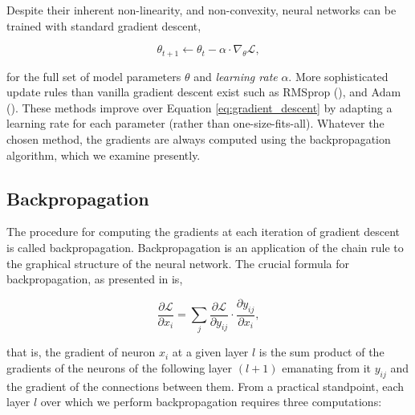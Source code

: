 Despite their inherent non-linearity, and non-convexity, neural networks can be trained with standard gradient descent,

\begin{equation}
\theta_{t+1} \leftarrow \theta_t - \alpha \cdot \nabla_{\theta}\mathcal{L},
\label{eq:gradient_descent}
\end{equation}

for the full set of model parameters $\theta$ and \emph{learning rate} $\alpha$. More sophisticated update rules than vanilla gradient descent exist such as RMSprop (\cite{tieleman2012lecture}), and Adam (\cite{kingma2014adam}). These methods improve over Equation \ref{eq:gradient_descent} by adapting a learning rate for each parameter (rather than one-size-fits-all). Whatever the chosen method, the gradients are always computed using the backpropagation algorithm, which we examine presently.


\subsection{Backpropagation}

The procedure for computing the gradients at each iteration of gradient descent is called backpropagation. Backpropagation is an application of the chain rule to the graphical structure of the neural network. The crucial formula for backpropagation, as presented in \cite{rumelhart1985learning} is,

\begin{equation}
\frac{\partial\mathcal{L}}{\partial x_i} = \sum_j \frac{\partial\mathcal{L}}{\partial y_{ij}}\cdot\frac{\partial y_{ij}}{\partial x_i},
\label{eq:backpropagation}
\end{equation}

that is, the gradient of neuron $x_i$ at a given layer $l$ is the sum product of the gradients of the neurons of the following layer $(l+1)$ emanating from it $y_{ij}$ and the gradient of the connections between them. From a practical standpoint, each layer $l$ over which we perform backpropagation requires three computations:

